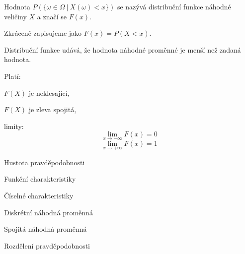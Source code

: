 \begin{compactitem}
    \item Hodnota $P(\{ \omega \in \Omega ~|~ X(\omega) < x \})$ se nazývá distribuční funkce náhodné veličiny $X$ a značí se $F(x)$.

    \item Zkráceně zapisujeme jako $F(x) = P(X < x)$.

    \item Distribuční funkce udává, že hodnota náhodné proměnné je menší než zadaná hodnota.

    \item Platí: \begin{compactitem}

        \item $F(X)$ je neklesající,
        \item $F(X)$ je zleva spojitá,
        \item limity:
        $$ \lim_{x \rightarrow - \infty} F(x) = 0 $$
        $$ \lim_{x \rightarrow + \infty} F(x) = 1 $$
    \end{compactitem}

\end{compactitem}

Hustota pravděpodobnosti

Funkční charakteristiky

Číselné charakteristiky

Diskrétní náhodná proměnná

Spojitá náhodná proměnná

Rozdělení pravděpodobnosti
